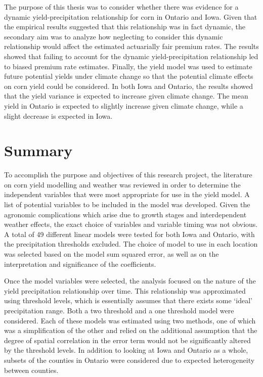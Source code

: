 The purpose of this thesis was to consider whether there was evidence for a dynamic yield-precipitation relationship for corn in Ontario and Iowa. Given that the empirical results suggested that this relationship was in fact dynamic, the secondary aim was to analyze how neglecting to consider this dynamic relationship would affect the estimated actuarially fair premium rates. The results showed that failing to account for the dynamic yield-precipitation relationship led to biased premium rate estimates. Finally, the yield model was used to estimate future potential yields under climate change so that the potential climate effects on corn yield could be considered. In both Iowa and Ontario, the results showed that the yield variance is expected to increase given climate change. The mean yield in Ontario is expected to slightly increase given climate change, while a slight decrease is expected in Iowa.

\section{Summary}

To accomplish the purpose and objectives of this research project, the literature on corn yield modelling and weather was reviewed in order to determine the independent variables that were most appropriate for use in the yield model. A list of potential variables to be included in the model was developed. Given the agronomic complications which arise due to growth stages and interdependent weather effects, the exact choice of variables and variable timing was not obvious. A total of 49 different linear models were tested for both Iowa and Ontario, with the precipitation thresholds excluded. The choice of model to use in each location was selected based on the model sum squared error, as well as on the interpretation and significance of the coefficients.

Once the model variables were selected, the analysis focused on the nature of the yield precipitation relationship over time. This relationship was approximated using threshold levels, which is essentially assumes that there exists some `ideal' precipitation range. Both a two threshold and a one threshold model were considered. Each of these models was estimated using two methods, one of which was a simplification of the other and relied on the additional assumption that the degree of spatial correlation in the error term would not be significantly altered by the threshold levels. In addition to looking at Iowa and Ontario as a whole, subsets of the counties in Ontario were considered due to expected heterogeneity between counties.

